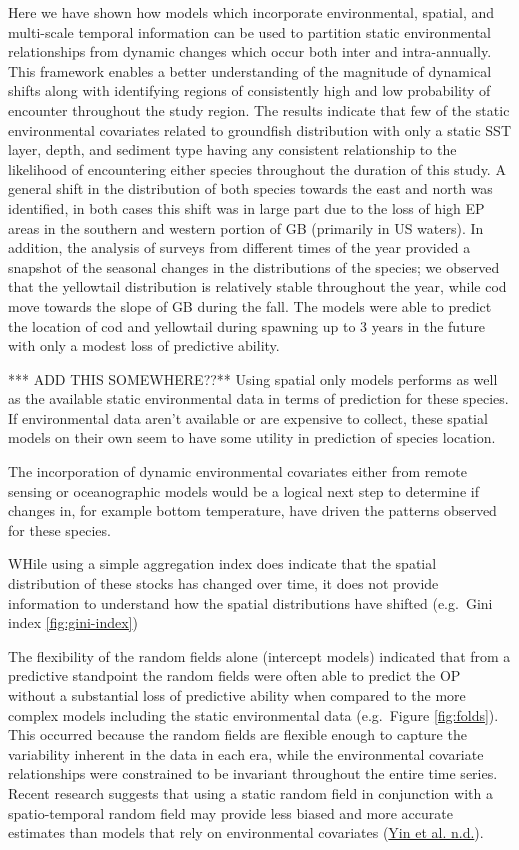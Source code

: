 \documentclass[
]{article}
\begin{document}
Here we have shown how models which incorporate environmental, spatial, and multi-scale temporal information can be used to partition static environmental relationships from dynamic changes which occur both inter and intra-annually. This framework enables a better understanding of the magnitude of dynamical shifts along with identifying regions of consistently high and low probability of encounter throughout the study region. The results indicate that few of the static environmental covariates related to groundfish distribution with only a static SST layer, depth, and sediment type having any consistent relationship to the likelihood of encountering either species throughout the duration of this study. A general shift in the distribution of both species towards the east and north was identified, in both cases this shift was in large part due to the loss of high EP areas in the southern and western portion of GB (primarily in US waters). In addition, the analysis of surveys from different times of the year provided a snapshot of the seasonal changes in the distributions of the species; we observed that the yellowtail distribution is relatively stable throughout the year, while cod move towards the slope of GB during the fall. The models were able to predict the location of cod and yellowtail during spawning up to 3 years in the future with only a modest loss of predictive ability.

*** ADD THIS SOMEWHERE??**
Using spatial only models performs as well as the available static environmental data in terms of prediction for these species. If environmental data aren't available or are expensive to collect, these spatial models on their own seem to have some utility in prediction of species location.

The incorporation of dynamic environmental covariates either from remote sensing or oceanographic models would be a logical next step to determine if changes in, for example bottom temperature, have driven the patterns observed for these species.

WHile using a simple aggregation index does indicate that the spatial distribution of these stocks has changed over time, it does not provide information to understand how the spatial distributions have shifted (e.g.~Gini index \ref{fig:gini-index})

The flexibility of the random fields alone (intercept models) indicated that from a predictive standpoint the random fields were often able to predict the OP without a substantial loss of predictive ability when compared to the more complex models including the static environmental data (e.g.~Figure \ref{fig:folds}). This occurred because the random fields are flexible enough to capture the variability inherent in the data in each era, while the environmental covariate relationships were constrained to be invariant throughout the entire time series. Recent research suggests that using a static random field in conjunction with a spatio-temporal random field may provide less biased and more accurate estimates than models that rely on environmental covariates (\protect\hyperlink{ref-yinPrepSpatiotemporalModel2019}{Yin et al. n.d.}).
\end{document}
